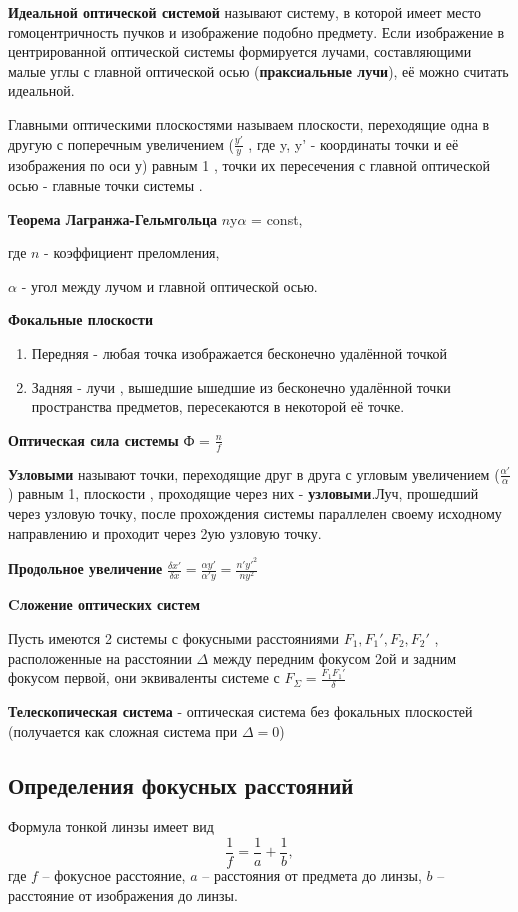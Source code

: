 \documentclass{article}
\begin{document}
\textbf{Идеальной оптической системой} называют систему, в которой имеет место гомоцентричность пучков и изображение подобно предмету.
Если изображение в центрированной оптической системы формируется лучами, составляющими малые углы с главной оптической осью (\textbf{праксиальные лучи}), её можно считать идеальной.

Главными оптическими плоскостями называем плоскости, переходящие одна в другую с поперечным увеличением ($\frac{y'}{y}$ , где y, y' - координаты точки и её изображения по оси у) равным 1 , точки их пересечения с главной оптической осью - главные точки системы .

\textbf{Теорема Лагранжа-Гельмгольца} $n$y$\alpha$ = const,

где $n$ - коэффициент преломления,

   $\alpha$ - угол между лучом и главной оптической осью.

\textbf{Фокальные плоскости}

\begin{enumerate}
    \item Передняя - любая точка изображается бесконечно удалённой точкой
    \item Задняя - лучи , вышедшие ышедшие из бесконечно удалённой
точки пространства предметов, пересекаются в некоторой её точке.
\end{enumerate}

\textbf{Оптическая сила системы} Ф = $\frac{n}{f}$

\textbf{Узловыми} называют точки, переходящие друг в друга с угловым увеличением ($\frac{\alpha'}{\alpha}$) равным 1, плоскости , проходящие через них - \textbf{узловыми}.Луч, прошедший через узловую точку, после прохождения системы параллелен своему исходному направлению и проходит через 2ую узловую точку.


\textbf{Продольное увеличение} $\frac{\delta x'}{\delta x} = \frac{\alpha y'}{\alpha' y} = \frac{n'y'^2}{ny^2}$

\textbf{Cложение оптических систем}

Пусть имеются 2 системы с фокусными расстояниями $F_1, F_1 ', F_2, F_2 '$ , расположенные на расстоянии $\Delta$ между передним фокусом 2ой и задним фокусом первой, они эквиваленты системе с $F_{\Sigma} = \frac{F_1 F_1 '}{\delta}$

\textbf{Телескопическая система} - оптическая система без фокальных плоскостей (получается как сложная система при $\Delta = 0$)

\subsection{Определения фокусных расстояний}
Формула тонкой линзы имеет вид
\begin{equation}
    \frac{1}{f} = \frac{1}{a} + \frac{1}{b},
\end{equation}
\noindent
где $f$ -- фокусное расстояние, $a$ -- расстояния от предмета до линзы, $b$ -- расстояние от изображения до линзы.
\end{document}
